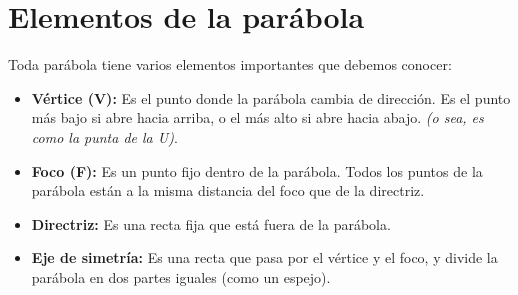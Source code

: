 \documentclass[12pt,a4paper]{article}
\begin{document}
	\section{Elementos de la parábola}

	\noindent
	\begin{minipage}[t]{0.52\textwidth}
	Toda parábola tiene varios elementos importantes que debemos conocer:

	\begin{itemize}
		\item \textbf{Vértice (V):} Es el punto donde la parábola cambia de dirección. Es el punto más bajo si abre hacia arriba, o el más alto si abre hacia abajo. \emph{(o sea, es como la punta de la U)}.

		\item \textbf{Foco (F):} Es un punto fijo dentro de la parábola. Todos los puntos de la parábola están a la misma distancia del foco que de la directriz.

		\item \textbf{Directriz:} Es una recta fija que está fuera de la parábola.

		\item \textbf{Eje de simetría:} Es una recta que pasa por el vértice y el foco, y divide la parábola en dos partes iguales (como un espejo).


	\end{itemize}
	\end{minipage}%
	\hfill
\end{document}
